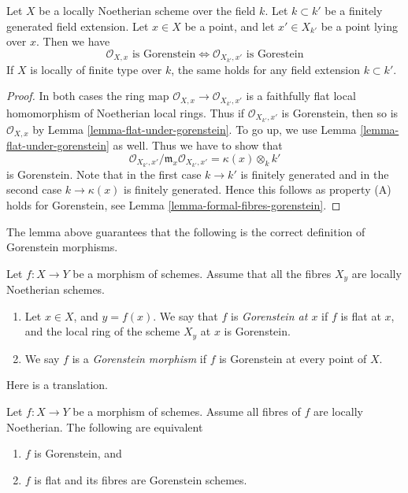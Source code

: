 \begin{lemma}
\label{lemma-gorenstein-base-change}
Let $X$ be a locally Noetherian scheme over the field $k$.
Let $k \subset k'$ be a finitely generated field extension.
Let $x \in X$ be a point, and let $x' \in X_{k'}$ be a point lying
over $x$. Then we have
$$
\mathcal{O}_{X, x}\text{ is Gorenstein}
\Leftrightarrow
\mathcal{O}_{X_{k'}, x'}\text{ is Gorestein}
$$
If $X$ is locally of finite type over $k$, the same holds for any
field extension $k \subset k'$.
\end{lemma}

\begin{proof}
In both cases the ring map $\mathcal{O}_{X, x} \to \mathcal{O}_{X_{k'}, x'}$
is a faithfully flat local homomorphism of Noetherian local rings.
Thus if $\mathcal{O}_{X_{k'}, x'}$ is Gorenstein, then so is
$\mathcal{O}_{X, x}$ by Lemma \ref{lemma-flat-under-gorenstein}.
To go up, we use Lemma \ref{lemma-flat-under-gorenstein} as well.
Thus we have to show that
$$
\mathcal{O}_{X_{k'}, x'}/\mathfrak m_x \mathcal{O}_{X_{k'}, x'} =
\kappa(x) \otimes_k k'
$$
is Gorenstein. Note that in the first case $k \to k'$ is finitely
generated and in the second case $k \to \kappa(x)$ is finitely
generated. Hence this follows as property (A) holds for
Gorenstein, see Lemma \ref{lemma-formal-fibres-gorenstein}.
\end{proof}

\noindent
The lemma above guarantees that the following is the correct definition
of Gorenstein morphisms.

\begin{definition}
\label{definition-gorenstein-morphism}
Let $f : X \to Y$ be a morphism of schemes.
Assume that all the fibres $X_y$ are locally Noetherian schemes.
\begin{enumerate}
\item Let $x \in X$, and $y = f(x)$. We say that $f$ is
{\it Gorenstein at $x$} if $f$ is flat at $x$, and the
local ring of the scheme $X_y$ at $x$ is Gorenstein.
\item We say $f$ is a {\it Gorenstein morphism} if $f$ is
Gorenstein at every point of $X$.
\end{enumerate}
\end{definition}

\noindent
Here is a translation.

\begin{lemma}
\label{lemma-gorenstein-morphism}
Let $f : X \to Y$ be a morphism of schemes.
Assume all fibres of $f$ are locally Noetherian.
The following are equivalent
\begin{enumerate}
\item $f$ is Gorenstein, and
\item $f$ is flat and its fibres are Gorenstein schemes.
\end{enumerate}
\end{lemma}

